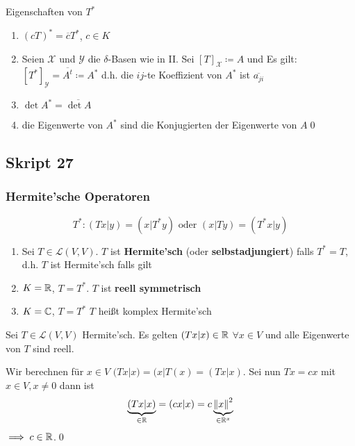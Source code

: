 Eigenschaften von $ T^* $ 
\begin{enumerate}[label=(\arabic*)]
	\item $ (cT)^* = \overline{c} T^* $, $ c \in K $ 
	\item Seien $ \mathcal{X} $ und $ \mathcal{Y}  $ die $ \delta $-Basen wie in II.
		Sei $ [T]_{\mathcal{X} } \coloneqq A $ und
		Es gilt: $ [T^*]_\mathcal{Y} = \overline{A^{t} } \coloneqq A^{*}  $ d.h. die $ ij $-te Koeffizient von $ A^* $ ist $ \overline{a_{ji} }  $ 
	\item $ \det A^* = \overline{\det A}  $ 
	\item die Eigenwerte von $ A^{*}  $ sind die Konjugierten der Eigenwerte von $ A $\qed
\end{enumerate}

\subsection{Skript 27}
\setcounter{subsubsection}{16}
\subsubsection{Hermite'sche Operatoren}
\[
	T^* : (Tx |y) = (x | T^*y) \text{ oder } (x | Ty) = (T^*x | y)
\]
\begin{subdefinition}
	\begin{enumerate}[label=(\roman*)]
		\item Sei $ T \in \mathcal{L} (V, V) $.
			$ T $ ist \textbf{Hermite'sch} (oder \textbf{selbstadjungiert}) falls $ T^* = T $, d.h. $ T $ ist Hermite'sch falls gilt
		\item $ K = \mathbb{R}  $, $ T = T^* $. $ T $ ist \textbf{reell symmetrisch}
		\item $ K = \mathbb{C}  $, $ T = T^* $ $ T $ heißt komplex Hermite'sch
	\end{enumerate}
\end{subdefinition}

\begin{subtheorem}
	Sei $ T \in \mathcal{L} (V, V) $ Hermite'sch.
	Es gelten $ (Tx | x) \in \mathbb{R}  $ $ \forall x \in V $ und alle Eigenwerte von $ T $ sind reell.
\end{subtheorem}
\begin{subproof*}
	Wir berechnen für $ x \in V $ 
	$ (Tx | x) = (x | T(x) = (Tx | x) $.
	Sei nun $ Tx = cx $ mit $ x \in V, x \neq 0 $ dann ist
	\[
		\underbrace{(Tx | x)}_{\in \mathbb{R} } = (c x | x) = c \underbrace{\left\| x \right\| ^2}_{\in \mathbb{R} ^x}
	\]
	$ \implies c \in \mathbb{R}  $.\qed
\end{subproof*}


